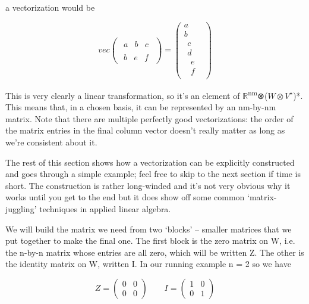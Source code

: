 \documentclass[oneside,english]{amsbook}
\numberwithin{section}{chapter}
\theoremstyle{plain}
\theoremstyle{definition}
\begin{document}
a vectorization would be

\[vec\begin{pmatrix}
	\begin{matrix}
		a & b & c
	\end{matrix} \\
	\begin{matrix}
		b & e & f
	\end{matrix}
\end{pmatrix} = \begin{pmatrix}
	a \\
	b \\
	\begin{matrix}
		c \\
		d \\
		\begin{matrix}
			e \\
			f
		\end{matrix}
	\end{matrix}
\end{pmatrix}\]

This is very clearly a linear transformation, so it's an element of
$\mathbb{R}$\textsuperscript{nm}⊗($W\otimes V^\star$)*. This means that, in a chosen
basis, it can be represented by an nm-by-nm matrix. Note that there are
multiple perfectly good vectorizations: the order of the matrix entries
in the final column vector doesn't really matter as long as we're
consistent about it.

The rest of this section shows how a vectorization can be explicitly
constructed and goes through a simple example; feel free to skip to the
next section if time is short. The construction is rather long-winded
and it's not very obvious why it works until you get to the end but it
does show off some common `matrix-juggling' techniques in applied
linear algebra.

We will build the matrix we need from two `blocks' -- smaller matrices
that we put together to make the final one. The first block is the zero
matrix on W, i.e. the n-by-n matrix whose entries are all zero, which
will be written Z. The other is the identity matrix on W, written I. In
our running example n = 2 so we have

\[Z = \begin{pmatrix}
	0 & 0 \\
	0 & 0
\end{pmatrix}\ \ \ \ \ \ \ \ \ I = \begin{pmatrix}
	1 & 0 \\
	0 & 1
\end{pmatrix}\]
\end{document}
